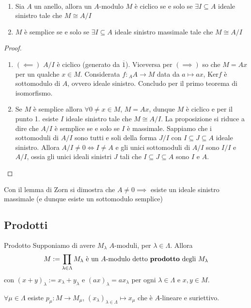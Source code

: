 \begin{proposition}{} \( \) 
\begin{enumerate}[label = \arabic*.]
    \item Sia \(A\) un anello, allora un \(A\)-modulo \(M\) è ciclico se e solo se \(\exists I \subseteq A \) ideale sinistro tale che \(M \cong A / I\) 
    \item \(M\) è semplice se e solo se \(\exists  I \subseteq A \) ideale
        sinistro massimale tale che \(M \cong A/I\) 
\end{enumerate}
\end{proposition}
\begin{proof}{}
\begin{enumerate}[label = \arabic*.]
    \item \({(\impliedby)}\) \(A / I\) è ciclico (generato da \(\overline{1}\)). Viceversa per \({(\implies )}\) so che \(M = Ax\) per un qualche \(x \in M\). Considerata \(
        f : {}_AA \to M\) data da \(a \mapsto ax\), \(\mathrm{Ker}f\) è
        sottomodulo di \(A\), ovvero ideale sinistro. Concludo per il primo
        teorema di isomorfismo.
    \item Se \(M\) è semplice allora \(\forall 0 \neq x \in M\), \(M = Ax\),
        dunque \(M\) è ciclico e per il punto 1. esiste \(I\) ideale sinistro
        tale che \(M \cong A/I\). La proposizione si riduce a dire che \(A/I\) è
        semplice se e solo se \(I\) è massimale. Sappiamo che i sottomoduli di
        \(A/I\) sono tutti e soli della forma \(J /I\) con \(I \subseteq J \subseteq A  \) ideale sinistro.
        Allora \(A / I \neq 0 \iff I \neq A\) e gli unici sottomoduli di \(A / I \) sono \(I / I\) e \(A / I\), ossia gli unici ideali sinistri \(J\) tali che \(I \subseteq J \subseteq A  \) sono \(I\) e \(A\).
\end{enumerate}
\end{proof}
\begin{remark}{}
    Con il lemma di Zorn si dimostra che \(A \neq 0 \implies \) esiste un ideale
    sinistro massimale (e dunque esiste un sottomodulo semplice)
\end{remark}

\subsection{Prodotti}
\begin{definition}{Prodotto}
Supponiamo di avere \(M_{\lambda} \) \(A\)-moduli, per \(\lambda \in \Lambda\). Allora 
\[
  M := \prod_{\lambda \in \Lambda} M_{\lambda} \text{ è un \(A\)-modulo detto \textbf{prodotto} degli \(M_{\lambda}\)}
\]
con \({(x + y)}_\lambda := x_\lambda + y_\lambda\)  e \({(ax)}_\lambda =
ax_\lambda\) per ogni \(\lambda \in \Lambda\) e \(x, y \in M\).

\(\forall \mu \in \Lambda\) esiste \(p_\mu : M \to M_\mu\), \({(x_{\lambda})}_{\lambda \in \Lambda} \mapsto x_\mu  \) che è \(A\)-lineare e suriettivo.
\end{definition}

